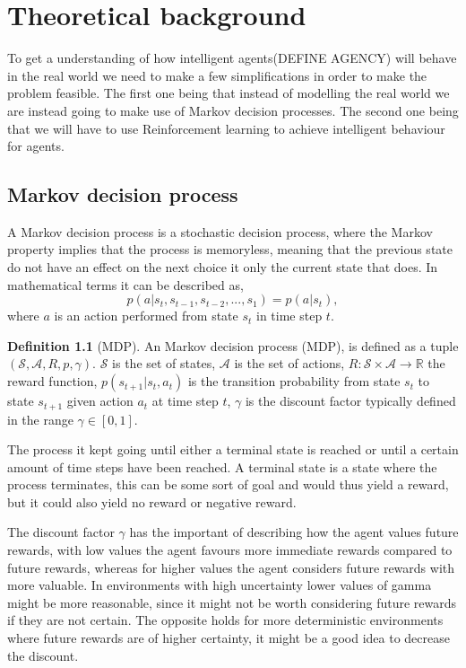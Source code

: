 \documentclass{report}
\theoremstyle{definition}
\newtheorem{definition}{Definition}[section]
\begin{document}

\chapter{Theoretical background}
To get a understanding of how intelligent agents(DEFINE AGENCY) will behave in the real world we need to make a few simplifications in order to make the problem feasible. The first one being that instead of modelling the real world we are instead going to make use of Markov decision processes. The second one being that we will have to use Reinforcement learning to achieve intelligent behaviour for agents. 

\section{Markov decision process}
A Markov decision process is a stochastic decision process, where the Markov property implies that the process is memoryless, meaning that the previous state do not have an effect on the next choice it only the current state that does. In mathematical terms it can be described as,
\[ p(a|s_t, s_{t-1}, s_{t-2}, ... , s_1) = p(a|s_t),\]
where $a$ is an action performed from state $s_t$ in time step $t$.

\begin{definition}[MDP]
    An Markov decision process (MDP), is defined as a tuple $(\mathcal{S}, \mathcal{A}, R, p, \gamma)$. $\mathcal{S}$ is the set of states, $\mathcal{A}$ is the set of actions, $R: \mathcal{S} \times \mathcal{A} \rightarrow \mathbb{R}$ the reward function, $p(s_{t+1}|s_t, a_t)$ is the transition probability from state $s_t$ to state $s_{t+1}$ given action $a_t$ at time step $t$, $\gamma$ is the discount factor typically defined in the range $\gamma \in [0, 1]$.
\end{definition}

The process it kept going until either a terminal state is reached or until a certain amount of time steps have been reached. A terminal state is a state where the process terminates, this can be some sort of goal and would thus yield a reward, but it could also yield no reward or negative reward.

The discount factor $\gamma$ has the important of describing how the agent values future rewards, with low values the agent favours more immediate rewards compared to future rewards, whereas for higher values the agent considers future rewards with more valuable. In environments with high uncertainty lower values of gamma might be more reasonable, since it might not be worth considering future rewards if they are not certain. The opposite holds for more deterministic environments where future rewards are of higher certainty, it might be a good idea to decrease the discount.
\end{document}

